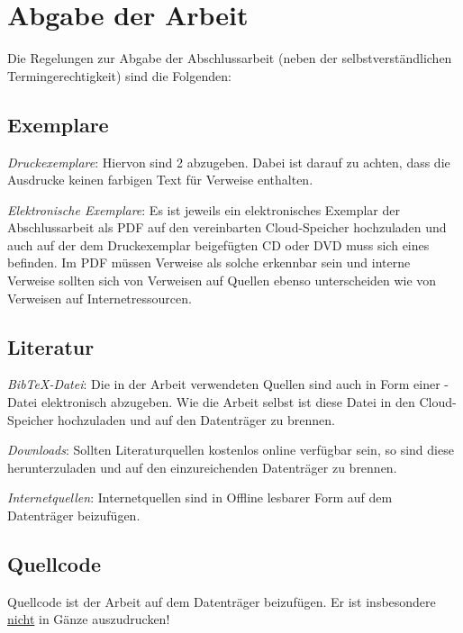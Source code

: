 \section{Abgabe der Arbeit}
\label{anh:Anh-Abgabe}
%
Die Regelungen zur Abgabe der Abschlussarbeit (neben der selbstverständlichen Termingerechtigkeit) sind die Folgenden:
%
\subsection{Exemplare}
\label{subsec:Anh-Abgabe-Exemplare}
%
\begin{compactenum}[(a)]
\item \emph{Druckexemplare}: 
  Hiervon sind 2 abzugeben. Dabei ist darauf zu achten, dass die Ausdrucke keinen farbigen Text für Verweise
  enthalten.
\item \emph{Elektronische Exemplare}: 
  Es ist jeweils ein elektronisches Exemplar der Abschlussarbeit als PDF auf den vereinbarten Cloud-Speicher hochzuladen und
  auch auf der dem Druckexemplar beigefügten CD oder DVD muss sich eines befinden. Im PDF müssen Verweise als solche
  erkennbar sein und interne Verweise sollten sich von Verweisen auf Quellen ebenso unterscheiden wie von Verweisen
  auf Internetressourcen.
\end{compactenum}
%
\subsection{Literatur}
\label{subsec:Anh-Abgabe-Literatur}
%
\begin{compactenum}[(a)]
\item \emph{Bib\TeX{}-Datei}:
  Die in der Arbeit verwendeten Quellen sind auch in Form einer -Datei elektronisch abzugeben. Wie
  die Arbeit selbst ist diese Datei in den Cloud-Speicher hochzuladen und auf den Datenträger zu brennen.
\item \emph{Downloads}:
  Sollten Literaturquellen kostenlos online verfügbar sein, so sind diese herunterzuladen und auf den einzureichenden
  Datenträger zu brennen.
\item \emph{Internetquellen}:
  Internetquellen sind in Offline lesbarer Form auf dem Datenträger beizufügen.
\end{compactenum}
%
\subsection{Quellcode}
\label{subsec:Anh-Abgabe-Quellcode}
%
Quellcode ist der Arbeit auf dem Datenträger beizufügen. Er ist insbesondere \underline{nicht} in Gänze auszudrucken!